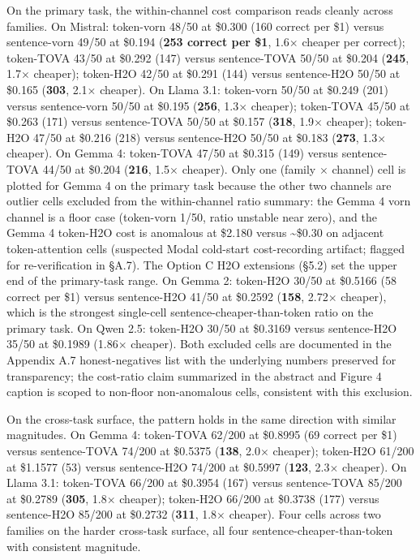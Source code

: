 \documentclass[10pt]{article}
\begin{document}
On the primary task, the within-channel cost comparison reads cleanly
across families. On Mistral:
token-vorn 48/50 at \$0.300 (160 correct per \$1) versus
sentence-vorn 49/50 at \$0.194 (\textbf{253 correct per \$1}, 1.6$\times$
cheaper per correct); token-TOVA 43/50 at \$0.292 (147) versus
sentence-TOVA 50/50 at \$0.204 (\textbf{245}, 1.7$\times$ cheaper);
token-H2O 42/50 at \$0.291 (144) versus sentence-H2O 50/50
at \$0.165 (\textbf{303}, 2.1$\times$ cheaper). On Llama 3.1: token-vorn
50/50 at \$0.249 (201) versus sentence-vorn 50/50 at \$0.195
(\textbf{256}, 1.3$\times$ cheaper); token-TOVA 45/50 at \$0.263 (171)
versus sentence-TOVA 50/50 at \$0.157 (\textbf{318}, 1.9$\times$
cheaper); token-H2O 47/50 at \$0.216 (218) versus
sentence-H2O 50/50 at \$0.183 (\textbf{273}, 1.3$\times$ cheaper). On
Gemma 4: token-TOVA 47/50 at \$0.315 (149) versus
sentence-TOVA 44/50 at \$0.204 (\textbf{216}, 1.5$\times$ cheaper). Only
one (family $\times$ channel) cell is plotted for Gemma 4 on the primary task
because the other two channels are outlier cells excluded from the
within-channel ratio summary: the Gemma 4 vorn channel is a floor case
(token-vorn 1/50, ratio unstable near zero), and the Gemma 4 token-H2O
cost is anomalous at \$2.180 versus \textasciitilde\$0.30 on adjacent
token-attention cells (suspected Modal cold-start cost-recording
artifact; flagged for re-verification in \S{}A.7). The Option C H2O
extensions (\S{}5.2) set the upper end of the primary-task range. On
Gemma 2: token-H2O 30/50 at \$0.5166 (58 correct per \$1) versus
sentence-H2O 41/50 at \$0.2592 (\textbf{158}, 2.72$\times$ cheaper), which
is the strongest single-cell sentence-cheaper-than-token ratio on the
primary task. On Qwen 2.5: token-H2O 30/50 at \$0.3169
versus sentence-H2O 35/50 at \$0.1989 (1.86$\times$ cheaper). Both excluded
cells are documented in the Appendix A.7 honest-negatives list with the underlying
numbers preserved for transparency; the cost-ratio claim summarized in
the abstract and Figure 4 caption is scoped to non-floor non-anomalous
cells, consistent with this exclusion.

On the cross-task surface, the
pattern holds in the same direction with similar magnitudes. On Gemma 4: token-TOVA 62/200 at
\$0.8995 (69 correct per \$1) versus sentence-TOVA 74/200 at
\$0.5375 (\textbf{138}, 2.0$\times$ cheaper); token-H2O 61/200 at
\$1.1577 (53) versus sentence-H2O 74/200 at \$0.5997
(\textbf{123}, 2.3$\times$ cheaper). On Llama 3.1: token-TOVA 66/200
at \$0.3954 (167) versus sentence-TOVA 85/200 at \$0.2789
(\textbf{305}, 1.8$\times$ cheaper); token-H2O 66/200 at \$0.3738 (177)
versus sentence-H2O 85/200 at \$0.2732 (\textbf{311}, 1.8$\times$
cheaper). Four cells across two families on the harder cross-task
surface, all four sentence-cheaper-than-token with consistent magnitude.
\end{document}
